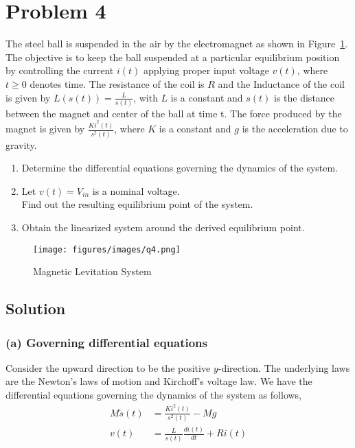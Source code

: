 \section*{Problem 4}

The steel ball is suspended in the air by the electromagnet as shown in Figure~\ref{fig:q4}.
The objective is to keep the ball suspended at a particular equilibrium position by controlling the current \(i(t)\) applying proper input voltage \(v(t)\), where \(t \geq 0\) denotes time.
The resistance of the coil is \(R\) and the Inductance of the coil is given by \(L(s(t)) = \frac{L}{s(t)}\), with \(L\) is a constant and \(s(t)\) is the distance between the magnet and center of the ball at time t.
The force produced by the magnet is given by \(\frac{K i^2(t)}{s^2(t)}\), where \(K\) is a constant and \(g\) is the acceleration due to gravity.

\begin{enumerate}[label= (\alph*)]
    \item Determine the differential equations governing the dynamics of the system.
    \item Let \(v(t) = V_{in}\) is a nominal voltage. \\
          Find out the resulting equilibrium point of the system.
    \item Obtain the linearized system around the derived equilibrium point.
\end{enumerate}

\begin{figure}[h]
    \centering
    \texttt{[image: figures/images/q4.png]}
    \caption{
        Magnetic Levitation System
    }\label{fig:q4}
\end{figure}

\subsection*{Solution}

\subsubsection*{(a) Governing differential equations}

Consider the upward direction to be the positive \(y\)-direction.
The underlying laws are the Newton's laws of motion and Kirchoff's voltage law.
We have the differential equations governing the dynamics of the system as follows,
\begin{align*}
    M \ddot s(t) & = \frac{Ki^2(t)}{s^2(t)} - Mg             \\
    v(t)         & = \frac{L}{s(t)}\frac{di(t)}{dt} + R i(t)
\end{align*}

